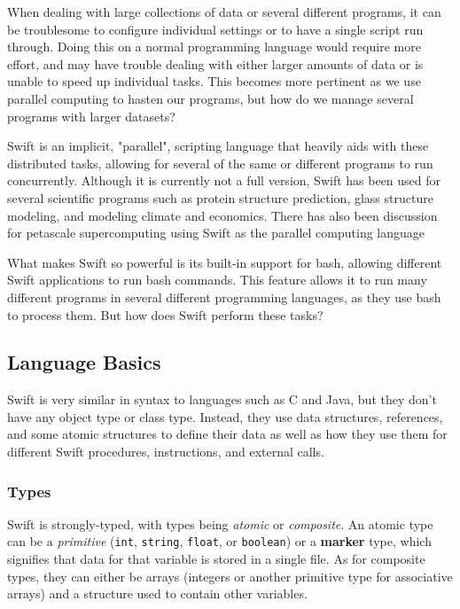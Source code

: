 \swiftColor
When dealing with large collections of data or several different programs, it can be troublesome to configure individual settings or to have a single script run through. Doing this on a normal programming language would require more effort, and may have trouble dealing with either larger amounts of data or is unable to speed up individual tasks. This becomes more pertinent as we use parallel computing to hasten our programs, but how do we manage several programs with larger datasets?

Swift is an implicit, "parallel", scripting language that heavily aids with these distributed tasks, allowing for several of the same or different programs to run concurrently. Although it is currently not a full version, Swift has been used for several scientific programs such as protein structure prediction, glass structure modeling, and modeling climate and economics. There has also been discussion for petascale supercomputing using Swift as the parallel computing language \cite{wilde2009parallel}

What makes Swift so powerful is its built-in support for bash, allowing different Swift applications to run bash commands. This feature allows it to run many different programs in several different programming languages, as they use bash to process them. But how does Swift perform these tasks?

\subsection{Language Basics}
    Swift is very similar in syntax to languages such as C and Java, but they don't have any object type or class type. Instead, they use data structures, references, and some atomic structures to define their data as well as how they use them for different Swift procedures, instructions, and external calls. \cite{website:swift-lang-documentation}

    \subsubsection{Types}
        Swift is strongly-typed, with types being \textit{atomic} or \textit{composite}. An atomic type can be a \textit{primitive} (\texttt{int}, \texttt{string}, \texttt{float}, or \texttt{boolean}) or a \textbf{marker} type, which signifies that data for that variable is stored in a single file. As for composite types, they can either be arrays (integers or another primitive type for associative arrays) and a structure used to contain other variables.

